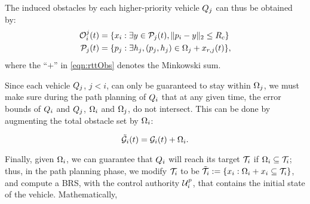 The induced obstacles by each higher-priority vehicle $Q_j$ can thus be obtained by: 
\begin{equation} 
\label{eqn:rttObs}
\begin{aligned}
\mathcal{O}_i^j(t) &=  \{x_i: \exists y \in \mathcal{P}_j(t), \|p_i - y\|_2 \le R_c \} \\
\mathcal{P}_j(t) &= \{p_j: \exists h_j, (p_j, h_j) \in \Omega_j  + x_{r,j}(t)\},
\end{aligned}
\end{equation}
\noindent where the ``$+$'' in \eqref{eqn:rttObs} denotes the Minkowski sum. %

Since each vehicle $Q_j$, $j<i$, can only be guaranteed to stay within $\Omega_j$, we must make sure during the path planning of $Q_i$ that at any given time, the error bounds of $Q_i$ and $Q_j$, $\Omega_i$ and $\Omega_j$, do not intersect. This can be done by augmenting the total obstacle set by $\Omega_i$:%

\vspace{-1em}
\begin{equation} 
\label{eqn:rttAugObs}
\tilde{\obsset}_i(t) = \obsset_i(t) + \disckernel_i.
\vspace{-1em}
\end{equation}

Finally, given $\Omega_i$, we can guarantee that $Q_i$ will reach its target $\mathcal{T}_i$ if $\Omega_i \subseteq \mathcal{T}_i$; thus, in the path planning phase, we modify $\mathcal{T}_i$ to be $\tilde{\mathcal{T}}_i := \{x_i: \Omega_i + x_i \subseteq \mathcal{T}_i\}$, and compute a BRS, with the control authority $\mathcal{U}^p_i$, that contains the initial state of the vehicle. Mathematically,

